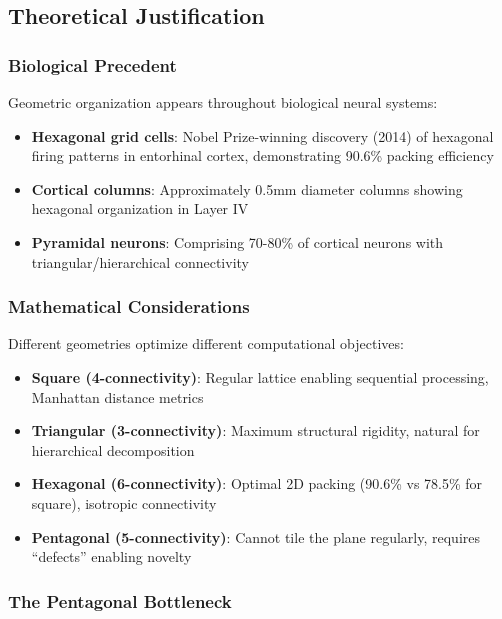\documentclass[mlmain]{jmlr}
\begin{document}
\subsection{Theoretical Justification}

\subsubsection{Biological Precedent}

Geometric organization appears throughout biological neural systems:

\begin{itemize}
\item \textbf{Hexagonal grid cells}: Nobel Prize-winning discovery (2014) of hexagonal firing patterns in entorhinal cortex, demonstrating 90.6\% packing efficiency
\item \textbf{Cortical columns}: Approximately 0.5mm diameter columns showing hexagonal organization in Layer IV
\item \textbf{Pyramidal neurons}: Comprising 70-80\% of cortical neurons with triangular/hierarchical connectivity
\end{itemize}

\subsubsection{Mathematical Considerations}

Different geometries optimize different computational objectives:

\begin{itemize}
\item \textbf{Square (4-connectivity)}: Regular lattice enabling sequential processing, Manhattan distance metrics
\item \textbf{Triangular (3-connectivity)}: Maximum structural rigidity, natural for hierarchical decomposition
\item \textbf{Hexagonal (6-connectivity)}: Optimal 2D packing (90.6\% vs 78.5\% for square), isotropic connectivity
\item \textbf{Pentagonal (5-connectivity)}: Cannot tile the plane regularly, requires ``defects'' enabling novelty
\end{itemize}

\subsubsection{The Pentagonal Bottleneck}
\end{document}
